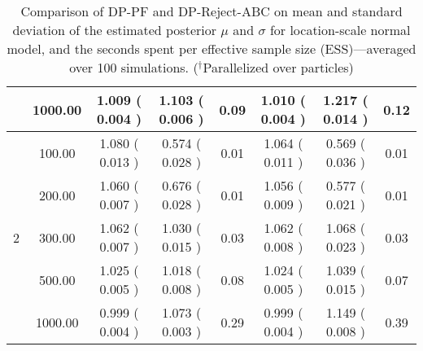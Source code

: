 \begin{table}[!htbp]
{\begin{tabular}{|c|c|ccc|ccc|}
      & 1000.00 & 1.009 ( 0.004 ) & 1.103 ( 0.006 ) & 0.09 & 1.010 ( 0.004 ) & 1.217 ( 0.014 ) & 0.12 \\ 
      \hline
      \multirow{5}{*}{2} & 100.00 & 1.080 ( 0.013 ) & 0.574 ( 0.028 ) & 0.01 & 1.064 ( 0.011 ) & 0.569 ( 0.036 ) & 0.01 \\ 
      & 200.00 & 1.060 ( 0.007 ) & 0.676 ( 0.028 ) & 0.01 & 1.056 ( 0.009 ) & 0.577 ( 0.021 ) & 0.01 \\ 
      & 300.00 & 1.062 ( 0.007 ) & 1.030 ( 0.015 ) & 0.03 & 1.062 ( 0.008 ) & 1.068 ( 0.023 ) & 0.03 \\ 
      & 500.00 & 1.025 ( 0.005 ) & 1.018 ( 0.008 ) & 0.08 & 1.024 ( 0.005 ) & 1.039 ( 0.015 ) & 0.07 \\ 
      & 1000.00 & 0.999 ( 0.004 ) & 1.073 ( 0.003 ) & 0.29 & 0.999 ( 0.004 ) & 1.149 ( 0.008 ) & 0.39 \\ 
        \hline
    \end{tabular}
    }
    \caption{Comparison of DP-PF and DP-Reject-ABC on mean and standard deviation of the estimated posterior $\mu$ and $\sigma$ for location-scale normal model, and the seconds spent per effective sample size (ESS)---averaged over 100 simulations. ($^\dagger$Parallelized over particles)}
    \end{table}